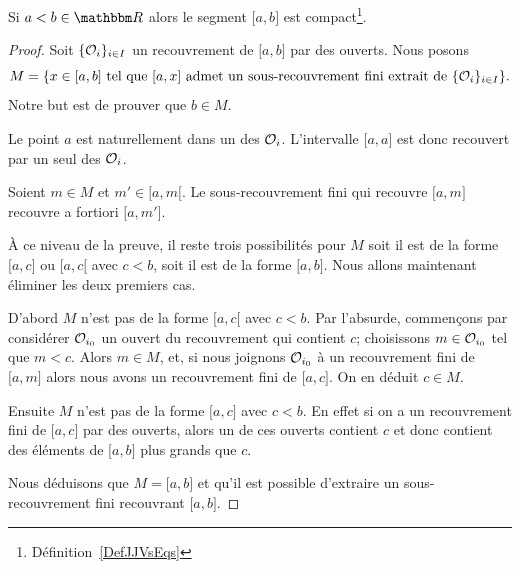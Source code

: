 \begin{lemma}\label{LemOACGWxV}
    Si \( a<b\in \eR\) alors le segment \( \mathopen[ a , b \mathclose]\) est compact\footnote{Définition~\ref{DefJJVsEqs}}.
\end{lemma}

\begin{proof}
    Soit \( \{ \mathcal{O}_i \}_{i\in I}\) un recouvrement de \( \mathopen[ a , b \mathclose]\) par des ouverts. Nous posons
    \begin{equation}
        M=\{ x\in\mathopen[ a , b \mathclose]\text{ tel que } \mathopen[ a , x \mathclose] \text{ admet un sous-recouvrement fini extrait de } \{ \mathcal{O}_i \}_{i\in I} \}.
    \end{equation}
    Notre but est de prouver que \( b\in M\).
    \begin{subproof}

    \item[\( a\) est dans \( M\)]

        Le point \( a\) est naturellement dans un des \( \mathcal{O}_i\). L'intervalle \( \mathopen[ a , a \mathclose]\) est donc recouvert par un seul des \( \mathcal{O}_i\).

    \item[\( M\) est un intervalle]

        Soient \( m\in M\) et \( m'\in\mathopen[ a , m [\). Le sous-recouvrement fini qui recouvre \( \mathopen[ a , m \mathclose]\) recouvre a fortiori \( \mathopen[ a , m' \mathclose]\).

    \item[Les trois possibilités restantes]
        À ce niveau de la preuve, il reste trois possibilités pour \( M\) soit il est de la forme \( \mathopen[ a , c \mathclose]\) ou \( \mathopen[ a , c [\) avec \( c<b\), soit il est de la forme \( \mathopen[ a , b \mathclose]\). Nous allons maintenant éliminer les deux premiers cas.

    \item[Ce que \( M\) n'est pas]

        D'abord \( M\) n'est pas de la forme \( \mathopen[ a , c [\) avec \( c<b\). Par l'absurde, commençons par considérer \( \mathcal{O}_{i_0}\) un ouvert du recouvrement qui contient \( c\); choisissons  \(m \in \mathcal{O}_{i_0}\) tel que \( m<c\). Alors \( m \in M \), et, si nous joignons \( \mathcal{O}_{i_0}\) à un recouvrement fini de \( \mathopen[ a , m \mathclose]\) alors nous avons un recouvrement fini de \( \mathopen[ a , c \mathclose]\). On en déduit \( c\in M\).

        Ensuite \( M\) n'est pas de la forme \( \mathopen[ a , c \mathclose]\) avec \( c<b\). En effet si on a un recouvrement fini de \( \mathopen[ a , c \mathclose]\) par des ouverts, alors un de ces ouverts contient \( c\) et donc contient des éléments de \( \mathopen[ a , b \mathclose]\) plus grands que \( c\).
    \end{subproof}
    Nous déduisons que \( M=\mathopen[ a , b \mathclose]\) et qu'il est possible d'extraire un sous-recouvrement fini recouvrant \( \mathopen[ a , b \mathclose]\).
\end{proof}

